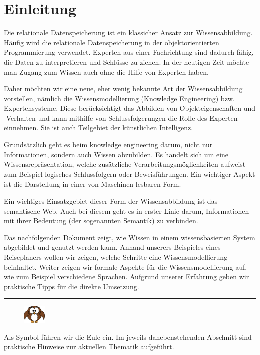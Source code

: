 \chapter{Einleitung}
\label{chap:einleitung}
Die relationale Datenspeicherung ist ein klassicher Ansatz zur Wissensabbildung. Häufig wird die relationale Datenspeicherung in der objektorientierten Programmierung verwendet. Experten aus einer Fachrichtung sind dadurch fähig, die Daten zu interpretieren und Schlüsse zu ziehen. In der heutigen Zeit möchte man Zugang zum Wissen auch ohne die Hilfe von Experten haben. 

Daher möchten wir eine neue, eher wenig bekannte Art der Wissensabbildung vorstellen, nämlich die Wissensmodellierung (Knowledge Engineering) bzw. Expertensysteme. Diese berücksichtigt das Abbilden von Objekteigenschaften und -Verhalten und kann mithilfe von Schlussfolgerungen die Rolle des Experten einnehmen. Sie ist auch Teilgebiet der künstlichen Intelligenz.

Grundsätzlich geht es beim knowledge engineering darum, nicht nur Informationen, sondern auch Wissen abzubilden. Es handelt sich um eine Wissensrepräsentation, welche zusätzliche Verarbeitungsmöglichkeiten aufweist zum Beispiel logisches Schlussfolgern oder Beweisführungen. Ein wichtiger Aspekt ist die Darstellung in einer von Maschinen lesbaren Form.~\cite{ISpekOntoGeschichte}

Ein wichtiges Einsatzgebiet dieser Form der Wissensabbildung ist das semantische Web. Auch bei diesem geht es in erster Linie darum, Informationen mit ihrer Bedeutung (der sogenannten Semantik) zu verbinden.

Das nachfolgenden Dokument zeigt, wie Wissen in einem wissensbasierten System abgebildet und genutzt werden kann. Anhand unserers Beispieles eines Reiseplaners wollen wir zeigen, welche Schritte eine Wissensmodellierung beinhaltet. Weiter zeigen wir formale Aspekte für die Wissensmodellierung auf, wie zum Beispiel verschiedene Sprachen. Aufgrund unserer Erfahrung geben wir praktische Tipps für die direkte Umsetzung.

\noindent\rule[1ex]{\textwidth}{1pt}
\begin{figure}
    \vspace{-12pt}
    \includegraphics[width=0.1\textwidth]{bilder/owl.png}
\end{figure}
Als Symbol führen wir die Eule ein. Im jeweils danebenstehenden Abschnitt sind praktische Hinweise zur aktuellen Thematik aufgeführt.

